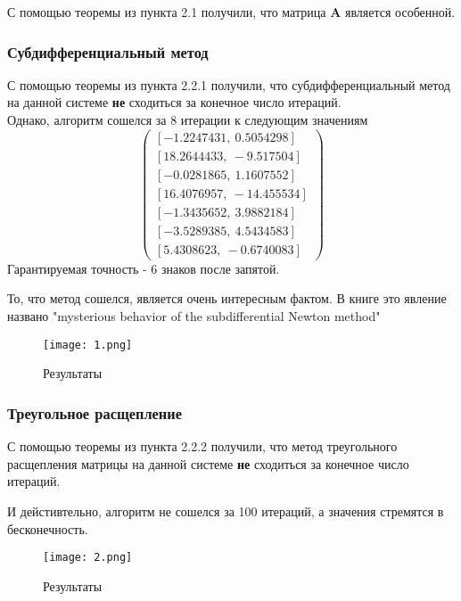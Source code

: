 \documentclass{article}
\begin{document}
    С помощью теоремы из пункта 2.1 получили, что матрица \textbf{A} является особенной.
    
    
    \subsubsection{Субдифференциальный метод}
    С помощью теоремы из пункта 2.2.1 получили, что субдифференциальный метод на данной системе \textbf{не} сходиться за конечное число итераций.\\
    
    Однако, алгоритм сошелся за 8 итерации к следующим значениям 
    \begin{equation*}
        \begin{pmatrix}
             [ -1.2247431, \ 0.5054298] \\
             [ 18.2644433, \  -9.517504] \\
             [ -0.0281865, \ 1.1607552] \\
             [ 16.4076957, \ -14.455534] \\
             [ -1.3435652, \ 3.9882184] \\
             [ -3.5289385, \ 4.5434583] \\
             [  5.4308623, \ -0.6740083]
        \end{pmatrix}
    \end{equation*}
    Гарантируемая точность - 6 знаков после запятой.
    
    То, что метод сошелся, является очень интересным фактом. В книге \cite{litlink3} это явление названо "mysterious behavior of the subdifferential Newton method"
     \begin{figure}[H]
        \centering
        \texttt{[image: 1.png]}
        \caption{Результаты}
    \end{figure}
    
    
    \subsubsection{Треугольное расщепление}
    С помощью теоремы из пункта 2.2.2 получили, что метод треугольного расщепления матрицы на данной системе \textbf{не} сходиться за конечное число итераций.
    
    И дейстивтельно, алгоритм не сошелся за 100 итераций, а значения стремятся в бесконечность.
    \begin{figure}[H]
        \centering
        \texttt{[image: 2.png]}
        \caption{Результаты}
    \end{figure}
    
\end{document}

